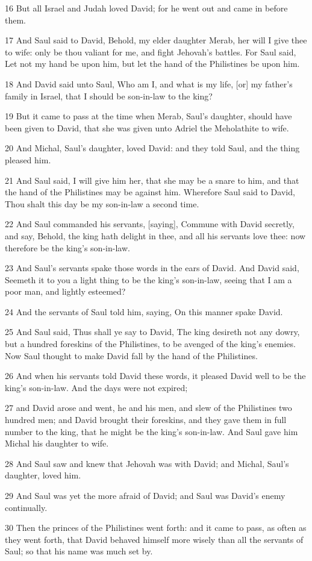\par 16 But all Israel and Judah loved David; for he went out and came in before them.
\par 17 And Saul said to David, Behold, my elder daughter Merab, her will I give thee to wife: only be thou valiant for me, and fight Jehovah's battles. For Saul said, Let not my hand be upon him, but let the hand of the Philistines be upon him.
\par 18 And David said unto Saul, Who am I, and what is my life, [or] my father's family in Israel, that I should be son-in-law to the king?
\par 19 But it came to pass at the time when Merab, Saul's daughter, should have been given to David, that she was given unto Adriel the Meholathite to wife.
\par 20 And Michal, Saul's daughter, loved David: and they told Saul, and the thing pleased him.
\par 21 And Saul said, I will give him her, that she may be a snare to him, and that the hand of the Philistines may be against him. Wherefore Saul said to David, Thou shalt this day be my son-in-law a second time.
\par 22 And Saul commanded his servants, [saying], Commune with David secretly, and say, Behold, the king hath delight in thee, and all his servants love thee: now therefore be the king's son-in-law.
\par 23 And Saul's servants spake those words in the ears of David. And David said, Seemeth it to you a light thing to be the king's son-in-law, seeing that I am a poor man, and lightly esteemed?
\par 24 And the servants of Saul told him, saying, On this manner spake David.
\par 25 And Saul said, Thus shall ye say to David, The king desireth not any dowry, but a hundred foreskins of the Philistines, to be avenged of the king's enemies. Now Saul thought to make David fall by the hand of the Philistines.
\par 26 And when his servants told David these words, it pleased David well to be the king's son-in-law. And the days were not expired;
\par 27 and David arose and went, he and his men, and slew of the Philistines two hundred men; and David brought their foreskins, and they gave them in full number to the king, that he might be the king's son-in-law. And Saul gave him Michal his daughter to wife.
\par 28 And Saul saw and knew that Jehovah was with David; and Michal, Saul's daughter, loved him.
\par 29 And Saul was yet the more afraid of David; and Saul was David's enemy continually.
\par 30 Then the princes of the Philistines went forth: and it came to pass, as often as they went forth, that David behaved himself more wisely than all the servants of Saul; so that his name was much set by.

